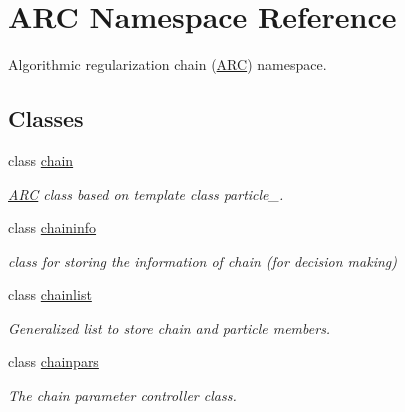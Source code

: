 \hypertarget{namespaceARC}{}\section{A\+RC Namespace Reference}
\label{namespaceARC}


Algorithmic regularization chain (\hyperlink{namespaceARC}{A\+RC}) namespace.  


\subsection*{Classes}
\begin{DoxyCompactItemize}
\item 
class \hyperlink{classARC_1_1chain}{chain}
\begin{DoxyCompactList}\small\item\em \hyperlink{namespaceARC}{A\+RC} class based on template class particle\+\_\+. \end{DoxyCompactList}\item 
class \hyperlink{classARC_1_1chaininfo}{chaininfo}
\begin{DoxyCompactList}\small\item\em class for storing the information of chain (for decision making) \end{DoxyCompactList}\item 
class \hyperlink{classARC_1_1chainlist}{chainlist}
\begin{DoxyCompactList}\small\item\em Generalized list to store chain and particle members. \end{DoxyCompactList}\item 
class \hyperlink{classARC_1_1chainpars}{chainpars}
\begin{DoxyCompactList}\small\item\em The chain parameter controller class. \end{DoxyCompactList}\end{DoxyCompactItemize}
